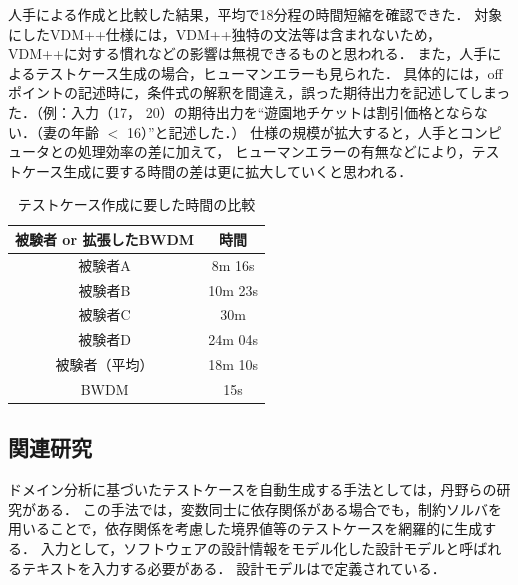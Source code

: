 \documentclass[uplatex, report, a4j, 10pt]{jsbook}
\begin{document}
人手による作成と比較した結果，平均で18分程の時間短縮を確認できた．
対象にしたVDM++仕様には，VDM++独特の文法等は含まれないため，
VDM++に対する慣れなどの影響は無視できるものと思われる．
また，人手によるテストケース生成の場合，ヒューマンエラーも見られた．
具体的には，offポイントの記述時に，条件式の解釈を間違え，誤った期待出力を記述してしまった．（例：入力（17， 20）の期待出力を“遊園地チケットは割引価格とならない．（妻の年齢 $<$ 16）”と記述した．）
仕様の規模が拡大すると，人手とコンピュータとの処理効率の差に加えて，
ヒューマンエラーの有無などにより，テストケース生成に要する時間の差は更に拡大していくと思われる．

\begin{table}[t]
  \begin{center}
    \caption{テストケース作成に要した時間の比較}
    \label{tab:time}
    \begin{tabular}{c|c}
      被験者 or 拡張したBWDM & 時間    \\
      \hline
      \hline
      被験者A                & 8m 16s  \\
      被験者B                & 10m 23s \\
      被験者C                & 30m     \\
      被験者D                & 24m 04s \\
      被験者（平均）         & 18m 10s \\
      BWDM                   & 15s     \\
      \hline
    \end{tabular}
  \end{center}
\end{table}

\subsection{関連研究}

ドメイン分析に基づいたテストケースを自動生成する手法としては，丹野らの研究\cite{sekkeiModel}がある．
この手法では，変数同士に依存関係がある場合でも，制約ソルバ\cite{sat}を用いることで，依存関係を考慮した境界値等のテストケースを網羅的に生成する．
入力として，ソフトウェアの設計情報をモデル化した設計モデルと呼ばれるテキストを入力する必要がある．
設計モデルは\cite{sekkeiModel}で定義されている．
\end{document}
